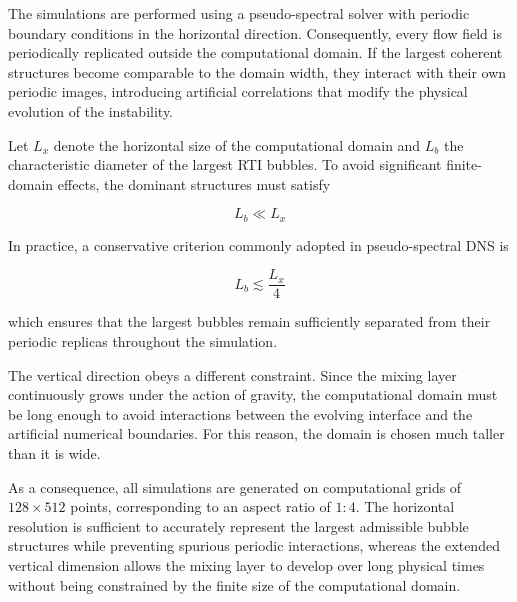 The simulations are performed using a pseudo-spectral solver with periodic
boundary conditions in the horizontal direction. Consequently, every flow field
is periodically replicated outside the computational domain. If the largest
coherent structures become comparable to the domain width, they interact with
their own periodic images, introducing artificial correlations that modify the
physical evolution of the instability.

Let $L_x$ denote the horizontal size of the computational domain and
$L_b$ the characteristic diameter of the largest RTI bubbles. To avoid
significant finite-domain effects, the dominant structures must satisfy

\begin{equation}
    L_b \ll L_x
\end{equation}

In practice, a conservative criterion commonly adopted in pseudo-spectral DNS is

\begin{equation}
    L_b \lesssim \frac{L_x}{4}
\end{equation}

which ensures that the largest bubbles remain sufficiently separated from their
periodic replicas throughout the simulation.

The vertical direction obeys a different constraint. Since the mixing layer
continuously grows under the action of gravity, the computational domain must be
long enough to avoid interactions between the evolving interface and the
artificial numerical boundaries. For this reason, the domain is chosen much
taller than it is wide.

As a consequence, all simulations are generated on computational grids of
$128\times512$ points, corresponding to an aspect ratio of $1:4$. The horizontal
resolution is sufficient to accurately represent the largest admissible bubble
structures while preventing spurious periodic interactions, whereas the extended
vertical dimension allows the mixing layer to develop over long physical times
without being constrained by the finite size of the computational domain.


